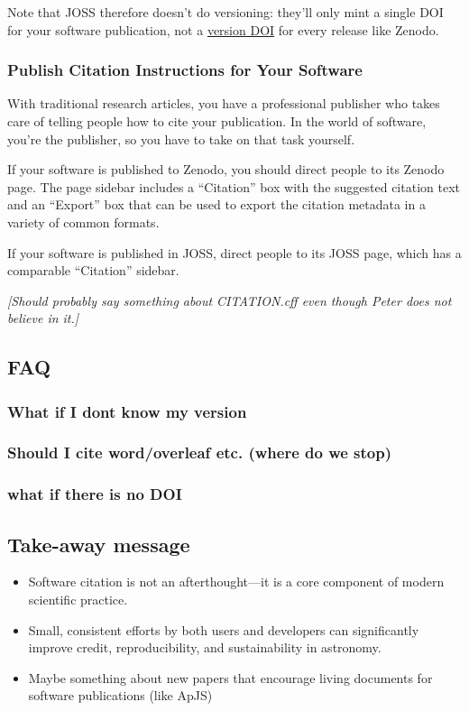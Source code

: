 \documentclass[twocolumn]{openjournal}
\begin{document}
Note that JOSS therefore doesn't do versioning: they'll only mint a single DOI for your software publication, not a \href{https://zenodo.org/help/versioning}{version DOI} for every release like Zenodo.

\subsubsection{Publish Citation Instructions for Your Software}

With traditional research articles, you have a professional publisher who takes care of telling people how to cite your publication. In the world of software, you're the publisher, so you have to take on that task yourself.

If your software is published to Zenodo, you should direct people to its Zenodo page. The page sidebar includes a ``Citation'' box with the suggested citation text and an ``Export'' box that can be used to export the citation metadata in a variety of common formats.

If your software is published in JOSS, direct people to its JOSS page, which has a comparable ``Citation'' sidebar.

\textit{[Should probably say something about CITATION.cff even though Peter does not believe in it.]}



\subsection{FAQ}

\subsubsection{What if I dont know my version}


\subsubsection{Should I cite word/overleaf etc. (where do we stop)}

\subsubsection{what if there is no DOI} 

\subsection{Take-away message}
\begin{itemize}
    \item Software citation is not an afterthought—it is a core component of modern scientific practice.
    \item Small, consistent efforts by both users and developers can significantly improve credit, reproducibility, and sustainability in astronomy.
    \item Maybe something about new papers that encourage living documents for software publications (like ApJS) 
\end{itemize}
\end{document}
